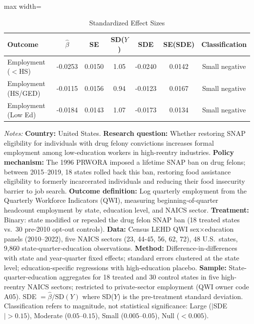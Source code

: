 \begin{table}[htbp]
\centering
\caption{Standardized Effect Sizes}
\label{tab:sde}
\begin{adjustbox}{max width=\textwidth}
\begin{tabular}{lcccccc}
\toprule
Outcome & $\hat{\beta}$ & SE & SD($Y$) & SDE & SE(SDE) & Classification \\
\midrule
Employment ($<$HS) & -0.0253 & 0.0150 & 1.05 & -0.0240 & 0.0142 & Small negative \\
Employment (HS/GED) & -0.0115 & 0.0156 & 0.94 & -0.0123 & 0.0167 & Small negative \\
Employment (Low Ed) & -0.0184 & 0.0143 & 1.07 & -0.0173 & 0.0134 & Small negative \\
\bottomrule
\end{tabular}
\end{adjustbox}
\par\vspace{0.3em}
{\footnotesize \textit{Notes:} \textbf{Country:} United States. \textbf{Research question:} Whether restoring SNAP eligibility for individuals with drug felony convictions increases formal employment among low-education workers in high-reentry industries. \textbf{Policy mechanism:} The 1996 PRWORA imposed a lifetime SNAP ban on drug felons; between 2015--2019, 18 states rolled back this ban, restoring food assistance eligibility to formerly incarcerated individuals and reducing their food insecurity barrier to job search. \textbf{Outcome definition:} Log quarterly employment from the Quarterly Workforce Indicators (QWI), measuring beginning-of-quarter headcount employment by state, education level, and NAICS sector. \textbf{Treatment:} Binary: state modified or repealed the drug felon SNAP ban (18 treated states vs.\ 30 pre-2010 opt-out controls). \textbf{Data:} Census LEHD QWI sex$\times$education panels (2010--2022), five NAICS sectors (23, 44-45, 56, 62, 72), 48 U.S.\ states, 9,860 state-quarter-education observations. \textbf{Method:} Difference-in-differences with state and year-quarter fixed effects; standard errors clustered at the state level; education-specific regressions with high-education placebo. \textbf{Sample:} State-quarter-education aggregates for 18 treated and 30 control states in five high-reentry NAICS sectors; restricted to private-sector employment (QWI owner code A05). SDE $= \hat{\beta} / \text{SD}(Y)$ where SD($Y$) is the pre-treatment standard deviation. Classification refers to magnitude, not statistical significance: Large ($|$SDE$| > 0.15$), Moderate ($0.05$--$0.15$), Small ($0.005$--$0.05$), Null ($< 0.005$).}
\end{table}
